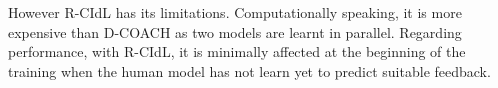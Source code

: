 However R-CIdL has its limitations. Computationally speaking, it is more expensive than D-COACH as two models are learnt in parallel. Regarding performance, with R-CIdL, it is minimally affected at the beginning of the training when the human model has not learn yet to predict suitable feedback.

